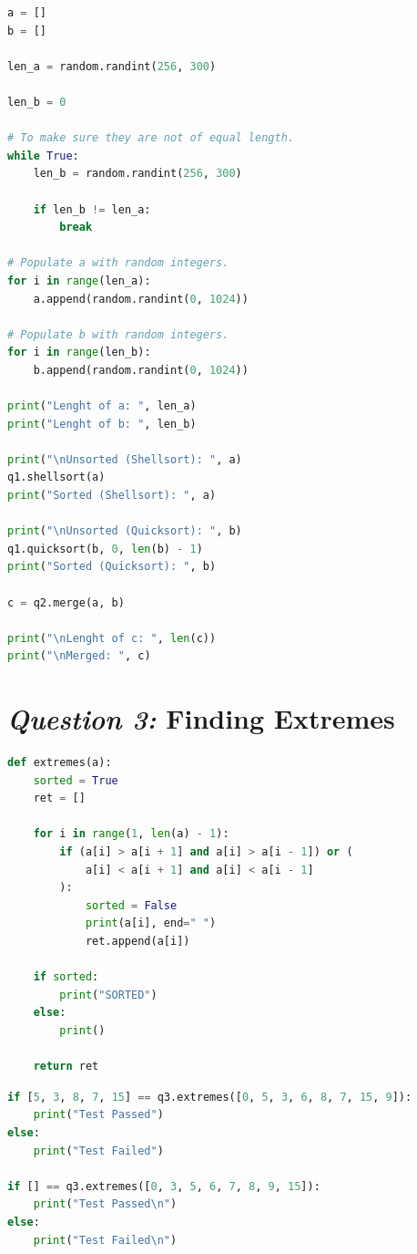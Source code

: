 \documentclass[12pt]{article}
\begin{document}
\pagebreak

\begin{lstlisting}[caption={Test for \textit{Question 2} (2)},language=Python]
a = []
b = []

len_a = random.randint(256, 300)

len_b = 0

# To make sure they are not of equal length.
while True:
    len_b = random.randint(256, 300)

    if len_b != len_a:
        break

# Populate a with random integers.
for i in range(len_a):
    a.append(random.randint(0, 1024))

# Populate b with random integers.
for i in range(len_b):
    b.append(random.randint(0, 1024))

print("Lenght of a: ", len_a)
print("Lenght of b: ", len_b)

print("\nUnsorted (Shellsort): ", a)
q1.shellsort(a)
print("Sorted (Shellsort): ", a)

print("\nUnsorted (Quicksort): ", b)
q1.quicksort(b, 0, len(b) - 1)
print("Sorted (Quicksort): ", b)

c = q2.merge(a, b)

print("\nLenght of c: ", len(c))
print("\nMerged: ", c)
\end{lstlisting}

\pagebreak

\section{\textit{Question 3:} Finding Extremes}

\begin{lstlisting}[caption={Extremes implementation},language=Python]
def extremes(a):
    sorted = True
    ret = []

    for i in range(1, len(a) - 1):
        if (a[i] > a[i + 1] and a[i] > a[i - 1]) or (
            a[i] < a[i + 1] and a[i] < a[i - 1]
        ):
            sorted = False
            print(a[i], end=" ")
            ret.append(a[i])

    if sorted:
        print("SORTED")
    else:
        print()

    return ret
\end{lstlisting}

\begin{lstlisting}[caption={Test for \textit{Question 3}
(1)},language=Python]
if [5, 3, 8, 7, 15] == q3.extremes([0, 5, 3, 6, 8, 7, 15, 9]):
    print("Test Passed")
else:
    print("Test Failed")

if [] == q3.extremes([0, 3, 5, 6, 7, 8, 9, 15]):
    print("Test Passed\n")
else:
    print("Test Failed\n")
\end{lstlisting}
\end{document}

